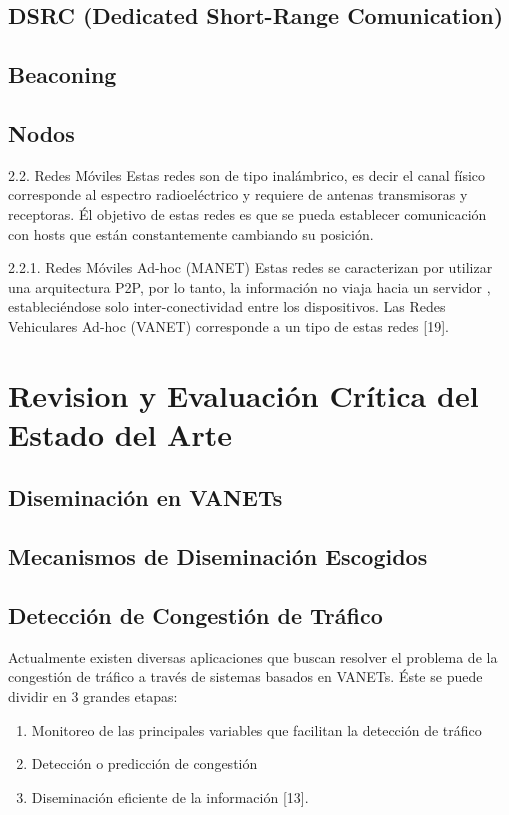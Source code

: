 \subsection{DSRC (Dedicated Short-Range Comunication)}

\subsection{Beaconing}

\subsection{Nodos}

2.2.	Redes Móviles
Estas redes son de tipo inalámbrico, es decir el canal físico corresponde al espectro radioeléctrico y requiere de antenas transmisoras y receptoras. Él objetivo de estas redes es que se pueda establecer comunicación con hosts que están constantemente cambiando su posición. 

2.2.1.	Redes Móviles Ad-hoc (MANET)
Estas redes se caracterizan por utilizar una arquitectura P2P, por  lo tanto, la información no viaja hacia un servidor , estableciéndose solo inter-conectividad entre los dispositivos. Las Redes Vehiculares Ad-hoc (VANET) corresponde a un tipo de estas redes  [19].



\section{Revision y Evaluación Crítica del Estado del Arte}

\subsection{Diseminación en VANETs}

\subsection{Mecanismos de Diseminación Escogidos}

\subsection{Detección de Congestión de Tráfico }

Actualmente existen diversas aplicaciones que buscan resolver el problema de la congestión de tráfico a través de sistemas basados en VANETs. Éste se puede dividir en 3 grandes etapas:
\begin{enumerate}
 \item Monitoreo de las principales variables que facilitan la detección de tráfico
 \item Detección o predicción de congestión 
 \item Diseminación eficiente de la información [13].
\end{enumerate}
 
